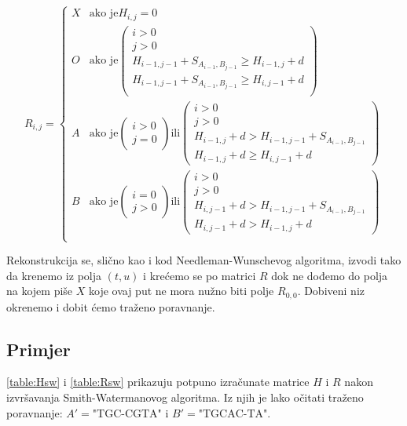 \documentclass[times, utf8, zavrsni]{fer}
\begin{document}
$$
R_{i,j} =  \left\{
	\begin{array}{ll}
		X & \mbox{ako je} H_{i,j}=0 \\
		O & \mbox{ako je} \left( \begin{array}{l} i>0 \\ j>0 \\
				H_{i-1,j-1} + S_{A_{i-1}, B_{j-1}} \geq H_{i-1,j} + d \\
				H_{i-1,j-1} + S_{A_{i-1}, B_{j-1}} \geq H_{i,j-1} + d \\
			\end{array} \right) \\
		A & \mbox{ako je} \left( \begin{array}{l} i>0 \\ j=0 \end{array} \right)
			\mbox{ili} \left( \begin{array}{l} i>0 \\ j>0 \\
				H_{i-1,j} + d > H_{i-1,j-1} + S_{A_{i-1}, B_{j-1}} \\
				H_{i-1,j} + d \geq H_{i,j-1} + d
			\end{array} \right) \\
		B & \mbox{ako je} \left( \begin{array}{l} i=0 \\ j>0 \end{array} \right)
			\mbox{ili} \left( \begin{array}{l} i>0 \\ j>0 \\
				H_{i,j-1} + d > H_{i-1,j-1} + S_{A_{i-1}, B_{j-1}} \\
				H_{i,j-1} + d > H_{i-1,j} + d
			\end{array} \right) \\
	\end{array}
\right.
$$

Rekonstrukcija se, slično kao i kod Needleman-Wunschevog algoritma,
izvodi tako da krenemo iz polja $(t, u)$ i krećemo se  po matrici $R$ dok
ne dođemo do polja na kojem piše $X$ koje ovaj put ne mora nužno biti 
polje $R_{0,0}$. Dobiveni niz okrenemo i dobit ćemo traženo poravnanje.

\subsection{Primjer}
\autoref{table:Hsw} i \autoref{table:Rsw} prikazuju potpuno izračunate
matrice $H$ i $R$ nakon izvršavanja Smith-Watermanovog algoritma. 
Iz njih je lako očitati traženo poravnanje: $A' = \mbox{"TGC-CGTA"}$ i
$B' = \mbox{"TGCAC-TA"}$.
\end{document}
